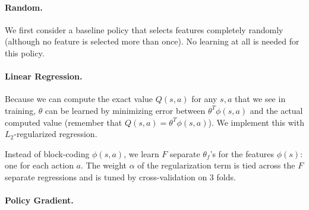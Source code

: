 \paragraph{Random.}
We first consider a baseline policy that selects features completely randomly (although no feature is selected more than once).
No learning at all is needed for this policy.

\paragraph{Linear Regression.}
Because we can compute the exact value $Q(s,a)$ for any $s,a$ that we see in training, $\theta$ can be learned by minimizing error between $\theta^T \phi(s,a)$ and the actual computed value (remember that $Q(s,a) = \theta^T \phi(s,a)$).
We implement this with $L_2$-regularized regression.

Instead of block-coding $\phi(s,a)$, we learn $F$ separate $\theta_f$'s for the features $\phi(s)$: one for each action $a$.
The weight $\alpha$ of the regularization term is tied across the $F$ separate regressions and is tuned by cross-validation on 3 folds.

\paragraph{Policy Gradient.}



